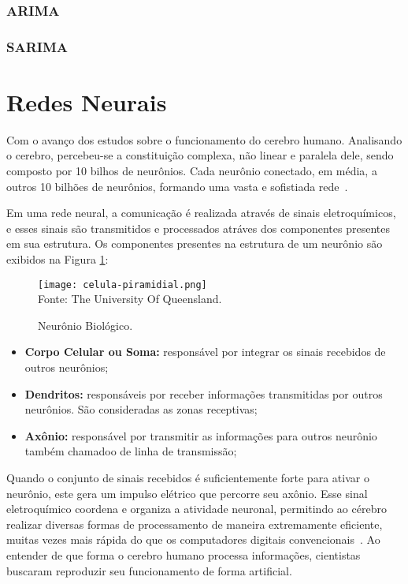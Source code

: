         \subsubsection{ARIMA}
        \subsubsection{SARIMA}

\section{Redes Neurais}
    Com o avanço dos estudos sobre o funcionamento do cerebro humano. Analisando o cerebro, percebeu-se a 
    constituição complexa, não linear e paralela dele, sendo composto por 10 bilhos de neurônios.
    Cada neurônio conectado, em média, a outros 10 bilhões de neurônios, formando uma 
    vasta e sofistiada rede~\cite{haykin2009neural}.

    Em uma rede neural, a comunicação é realizada através de sinais eletroquímicos, e esses sinais são transmitidos 
    e processados atráves dos componentes presentes em sua estrutura. Os componentes presentes na estrutura de um neurônio 
    são exibidos na Figura \ref{fig:neuronio_biologico}:
    \begin{figure}[!htb]
        \centering
        \caption{Neurônio Biológico.}
        \texttt{[image: celula-piramidial.png]}\\
        {\footnotesize Fonte: The University Of Queensland.}\
        \label{fig:neuronio_biologico}
    \end{figure}
    
    \begin{itemize}
        \item \textbf{Corpo Celular ou Soma: }responsável por integrar os sinais recebidos de outros neurônios;
        \item \textbf{Dendritos: }responsáveis por receber informações transmitidas por outros neurônios. 
        São consideradas as zonas receptivas;
        \item \textbf{Axônio: }responsável por transmitir as informações para outros neurônio também chamadoo de linha de 
        transmissão;
    \end{itemize}

    Quando o conjunto de sinais recebidos é suficientemente forte para ativar o neurônio, este gera um impulso elétrico 
    que percorre seu axônio. Esse sinal eletroquímico coordena e organiza a atividade neuronal, permitindo ao cérebro realizar 
    diversas formas de processamento de maneira extremamente eficiente, muitas vezes mais rápida do que os computadores digitais 
    convencionais~\cite{haykin2009neural}. Ao entender de que forma o cerebro humano processa informações, cientistas buscaram 
    reproduzir seu funcionamento de forma artificial.
    

